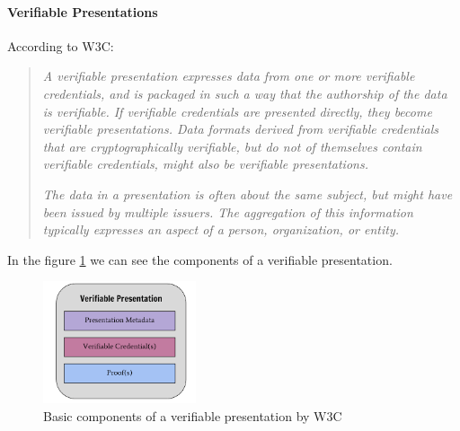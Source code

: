 \documentclass[a4paper, 12pt]{article} %
\begin{document}
                \paragraph{Verifiable Presentations}
                    According to W3C\cite{w3c-vc}:
                    \begin{quote}
                        \textit{A verifiable presentation expresses data from one or more verifiable credentials, and is packaged in such a way that the authorship of the data is verifiable. If verifiable credentials are presented directly, they become verifiable presentations. Data formats derived from verifiable credentials that are cryptographically verifiable, but do not of themselves contain verifiable credentials, might also be verifiable presentations.}
                        
                        \textit{The data in a presentation is often about the same subject, but might have been issued by multiple issuers. The aggregation of this information typically expresses an aspect of a person, organization, or entity.}
                    \end{quote}
                    In the figure \ref{fig:ssi-vp} we can see the components of a verifiable presentation.
                    \begin{figure}[ht] 
                        \centering
                        \includegraphics[width=0.4\textwidth]{ssi-vp.png}
                        \caption{Basic components of a verifiable presentation by W3C}
                        \label{fig:ssi-vp}
                    \end{figure}
\end{document}
